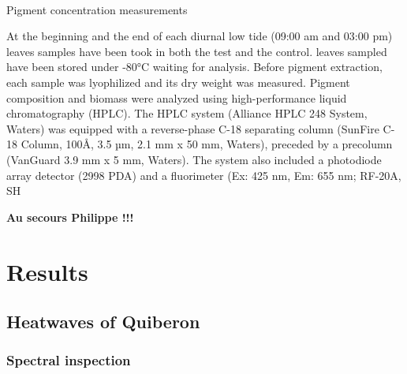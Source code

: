 \documentclass[
  number]{elsarticle}
\makeatletter
\let\oldparagraph\paragraph
\renewcommand{\paragraph}{
    \@ifstar
      \xxxParagraphStar
      \xxxParagraphNoStar
  }
\newcommand{\xxxParagraphStar}[1]{\oldparagraph*{#1}\mbox{}}
\newcommand{\xxxParagraphNoStar}[1]{\oldparagraph{#1}\mbox{}}
\makeatother
\begin{document}
\paragraph{Pigment concentration
measurements}\label{pigment-concentration-measurements}

At the beginning and the end of each diurnal low tide (09:00 am and
03:00 pm) leaves samples have been took in both the test and the
control. leaves sampled have been stored under -80°C waiting for
analysis. Before pigment extraction, each sample was lyophilized and its
dry weight was measured. Pigment composition and biomass were analyzed
using high-performance liquid chromatography (HPLC). The HPLC system
(Alliance HPLC 248 System, Waters) was equipped with a reverse-phase
C-18 separating column (SunFire C-18 Column, 100Å, 3.5 µm, 2.1 mm x 50
mm, Waters), preceded by a precolumn (VanGuard 3.9 mm x 5 mm, Waters).
The system also included a photodiode array detector (2998 PDA) and a
fluorimeter (Ex: 425 nm, Em: 655 nm; RF-20A, SH

\textbf{Au secours Philippe !!!}

\section{Results}\label{results}

\subsection{Heatwaves of Quiberon}\label{heatwaves-of-quiberon}

\subsubsection{Spectral inspection}\label{spectral-inspection}
\end{document}
